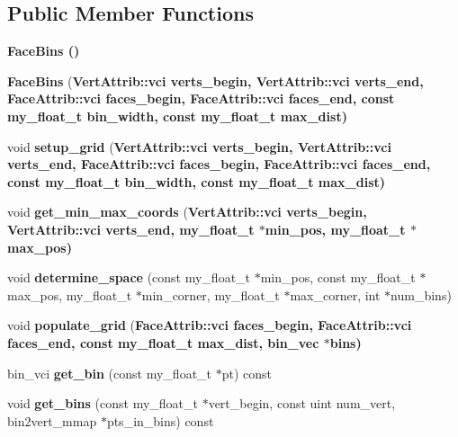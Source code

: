 \subsection*{Public Member Functions}
\begin{CompactItemize}
\item 
\bf{Face\-Bins} ()
\item 
\textbf{Face\-Bins} (\bf{Vert\-Attrib::vci} verts\_\-begin, \bf{Vert\-Attrib::vci} verts\_\-end, \bf{Face\-Attrib::vci} faces\_\-begin, \bf{Face\-Attrib::vci} faces\_\-end, const my\_\-float\_\-t bin\_\-width, const my\_\-float\_\-t max\_\-dist)\label{classASCbase_1_1geometry_1_1FaceBins_4c2d64589bee14f2d5e6f8bf95c10ca4}

\item 
void \textbf{setup\_\-grid} (\bf{Vert\-Attrib::vci} verts\_\-begin, \bf{Vert\-Attrib::vci} verts\_\-end, \bf{Face\-Attrib::vci} faces\_\-begin, \bf{Face\-Attrib::vci} faces\_\-end, const my\_\-float\_\-t bin\_\-width, const my\_\-float\_\-t max\_\-dist)\label{classASCbase_1_1geometry_1_1FaceBins_d19badcdb6aa99d802205df2449c3ee7}

\item 
void \textbf{get\_\-min\_\-max\_\-coords} (\bf{Vert\-Attrib::vci} verts\_\-begin, \bf{Vert\-Attrib::vci} verts\_\-end, my\_\-float\_\-t $\ast$min\_\-pos, my\_\-float\_\-t $\ast$max\_\-pos)\label{classASCbase_1_1geometry_1_1FaceBins_3363105babb3c5ac2014cf56c86c2f37}

\item 
void \textbf{determine\_\-space} (const my\_\-float\_\-t $\ast$min\_\-pos, const my\_\-float\_\-t $\ast$max\_\-pos, my\_\-float\_\-t $\ast$min\_\-corner, my\_\-float\_\-t $\ast$max\_\-corner, int $\ast$num\_\-bins)\label{classASCbase_1_1geometry_1_1FaceBins_d00b418f2769fad3b4f2411283818bb0}

\item 
void \textbf{populate\_\-grid} (\bf{Face\-Attrib::vci} faces\_\-begin, \bf{Face\-Attrib::vci} faces\_\-end, const my\_\-float\_\-t max\_\-dist, bin\_\-vec $\ast$bins)\label{classASCbase_1_1geometry_1_1FaceBins_af9ff3db3104f3f0c7a8fa05b32f188c}

\item 
bin\_\-vci \textbf{get\_\-bin} (const my\_\-float\_\-t $\ast$pt) const \label{classASCbase_1_1geometry_1_1FaceBins_334984c474fa134ceb52b605585784f9}

\item 
void \textbf{get\_\-bins} (const my\_\-float\_\-t $\ast$vert\_\-begin, const uint num\_\-vert, bin2vert\_\-mmap $\ast$pts\_\-in\_\-bins) const \label{classASCbase_1_1geometry_1_1FaceBins_d5ea38b17d0b71c1b782f2c1491622d2}


\end{CompactItemize}
